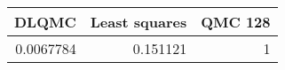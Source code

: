 \begin{tabular}{rrr}
\toprule
     DLQMC &   Least squares &   QMC 128 \\
\midrule
 0.0067784 &        0.151121 &         1 \\
\bottomrule
\end{tabular}
